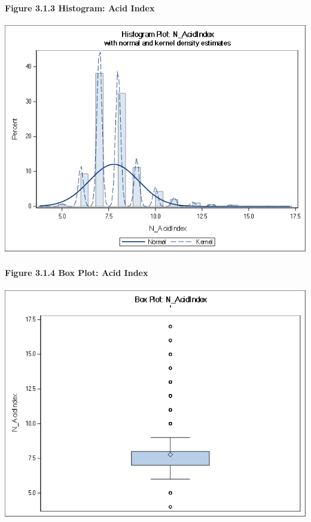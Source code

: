 \documentclass[]{article}
\let\oldparagraph\paragraph
\renewcommand{\paragraph}[1]{\oldparagraph{#1}\mbox{}}
\begin{document}
\newpage

\paragraph{Figure 3.1.3 Histogram: Acid
Index}\label{figure-3.1.3-histogram-acid-index}

\includegraphics[height=3.95833in]{images/hist_acidindex.png}

\paragraph{Figure 3.1.4 Box Plot: Acid
Index}\label{figure-3.1.4-box-plot-acid-index}

\includegraphics[height=3.95833in]{images/box_acidindex.png}
\end{document}
